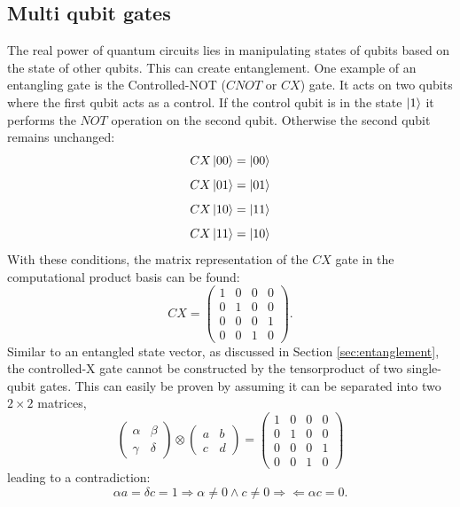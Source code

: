 	\subsection{Multi qubit gates} \label{sec:multi_qubit_gates}
		The real power of quantum circuits lies in manipulating states of qubits based on the state of other qubits.
		This can create entanglement. One example of an entangling gate is the Controlled-NOT ($CNOT$ or $CX$) gate.
		It acts on two qubits where the first qubit acts as a control.
		If the control qubit is in the state $\ket{1}$ it performs the $NOT$ operation on the second qubit. Otherwise the second qubit remains unchanged:
		\begin{equation}
			\label{eq:cx_action_on_eigenstate00}
			CX\ket{00}=\ket{00}
		\end{equation}
		\begin{equation}
			\label{eq:cx_action_on_eigenstate01}
			CX\ket{01}=\ket{01}
		\end{equation}
		\begin{equation}
			\label{eq:cx_action_on_eigenstate10}
			CX\ket{10}=\ket{11}
		\end{equation}
		\begin{equation}
			\label{eq:cx_action_on_eigenstate11}
			CX\ket{11}=\ket{10}
		\end{equation}
		With these conditions, the matrix representation of the $CX$ gate in the computational product basis can be found:
		\begin{equation}
			\label{eq:cx_matrix_representation}
			CX=
			\begin{pmatrix}
				1 & 0 & 0 & 0 \\
				0 & 1 & 0 & 0 \\
				0 & 0 & 0 & 1 \\
				0 & 0 & 1 & 0
			\end{pmatrix}.
		\end{equation}
		Similar to an entangled state vector, as discussed in Section \ref{sec:entanglement}, the controlled-X gate cannot be constructed by the tensorproduct of two single-qubit gates. This can easily be proven by assuming it can be separated into two $2 \times 2$ matrices,
		\begin{equation}
			\label{eq:assume_cx_separable}
			\begin{pmatrix}
				\alpha & \beta \\
				\gamma & \delta
			\end{pmatrix}\otimes
			\begin{pmatrix}
				a & b \\
				c & d
			\end{pmatrix}=
			\begin{pmatrix}
				1 & 0 & 0 & 0 \\
				0 & 1 & 0 & 0 \\
				0 & 0 & 0 & 1 \\
				0 & 0 & 1 & 0
			\end{pmatrix}
		\end{equation}
		leading to a contradiction:
		\begin{equation}
			\label{eq:cx_separability_contradiction}
			\alpha a = \delta c = 1 \Rightarrow \alpha \neq 0 \land c \neq 0 \Rightarrow\!\Leftarrow \alpha c = 0.
		\end{equation}

